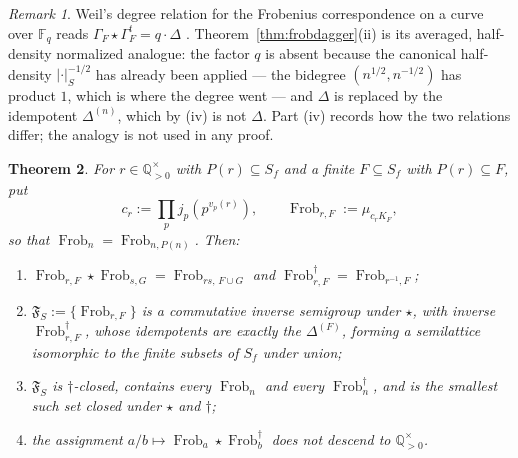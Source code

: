 \documentclass[11pt]{amsart}
\newtheorem{theorem}{Theorem}[section]
\theoremstyle{definition}
\theoremstyle{remark}
\newtheorem{remark}[theorem]{Remark}
\newcommand{\Q}{\mathbb Q}
\newcommand{\F}{\mathbb F}
\newcommand{\Frob}{\operatorname{Frob}}
\begin{document}
\begin{remark}\label{rem:weildegree}
Weil's degree relation for the Frobenius correspondence on a curve over $\F_q$
reads $\Gamma_F\star\Gamma_F^t=q\cdot\Delta$ \cite{Weil1948}.
Theorem~\ref{thm:frobdagger}(ii) is its averaged, half-density normalized
analogue: the factor $q$ is absent because the canonical half-density
$|\cdot|_S^{-1/2}$ has already been applied --- the bidegree
$(n^{1/2},n^{-1/2})$ has product $1$, which is where the degree went --- and
$\Delta$ is replaced by the idempotent $\Delta^{(n)}$, which by (iv) is
not $\Delta$.  Part (iv) records how the two relations differ; the analogy is
not used in any proof.
\end{remark}

\begin{theorem}\label{thm:invsemigroup}
For $r\in\Q_{>0}^\times$ with $P(r)\subseteq S_f$ and a finite $F\subseteq S_f$
with $P(r)\subseteq F$, put
\begin{equation}\label{eq:gradedfrob}
  c_r:=\prod_p j_p(p^{v_p(r)}),\qquad \Frob_{r,F}:=\mu_{c_rK_F},
\end{equation}
so that $\Frob_n=\Frob_{n,P(n)}$. Then:
\begin{enumerate}
\item[(i)] $\Frob_{r,F}\star\Frob_{s,G}=\Frob_{rs,\,F\cup G}$ and
$\Frob_{r,F}^\dagger=\Frob_{r^{-1},F}$;
\item[(ii)] $\mathfrak F_S:=\{\Frob_{r,F}\}$ is a commutative \emph{inverse
semigroup} under $\star$, with inverse $\Frob_{r,F}^\dagger$, whose idempotents
are exactly the $\Delta^{(F)}$, forming a semilattice isomorphic to the finite
subsets of $S_f$ under union;
\item[(iii)] $\mathfrak F_S$ is $\dagger$-closed, contains every $\Frob_n$ and
every $\Frob_n^\dagger$, and is the smallest such set closed under $\star$ and
$\dagger$;
\item[(iv)] the assignment $a/b\mapsto\Frob_a\star\Frob_b^\dagger$ does
\emph{not} descend to $\Q_{>0}^\times$.
\end{enumerate}
\end{theorem}
\end{document}
